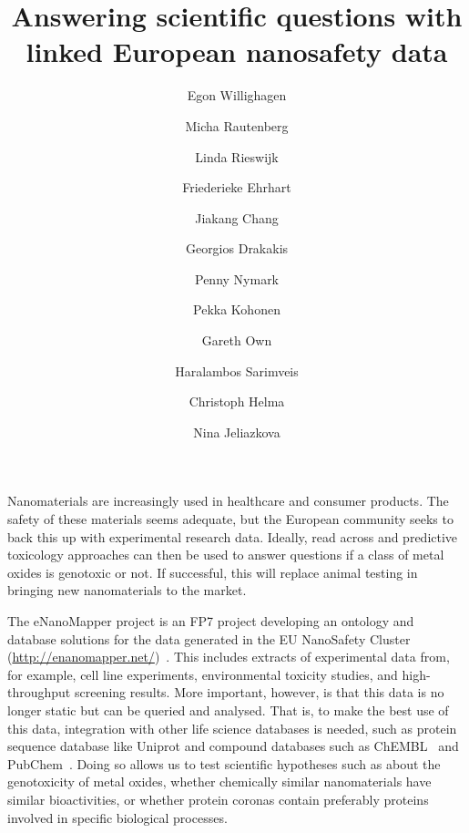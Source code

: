\documentclass{llncs}
\begin{document}
\title{Answering scientific questions with linked European nanosafety data}

\author{
  Egon Willighagen \and
  Micha Rautenberg \and
  Linda Rieswijk \and
  Friederieke Ehrhart \and
  Jiakang Chang \and
  Georgios Drakakis \and
  Penny Nymark \and
  Pekka Kohonen \and
  Gareth Own \and
  Haralambos Sarimveis \and
  Christoph Helma \and
  Nina Jeliazkova
}


\maketitle

Nanomaterials are increasingly used in healthcare and consumer products. The 
safety of these materials seems adequate, but the European community seeks to 
back this up with experimental research data. Ideally, read across and 
predictive toxicology approaches can then be used to answer questions if a class 
of metal oxides is genotoxic or not. If successful, this will replace animal 
testing in bringing new nanomaterials to the market.

The eNanoMapper project is an FP7 project developing an ontology and database 
solutions for the data generated in the EU NanoSafety
Cluster (\url{http://enanomapper.net/})~\cite{Hastings2015,Jeliazkova2015}. This 
includes extracts of experimental data from, for example, cell line experiments, 
environmental toxicity studies, and high-throughput screening results. More 
important, however, is that this data is no longer static but can be queried and 
analysed. That is, to make the best use of this data, integration with other 
life science databases is needed, such as protein sequence database like Uniprot 
and compound databases such as ChEMBL~\cite{Willighagen2013} and
PubChem~\cite{Fu2015}. Doing so allows us to 
test scientific hypotheses such as about the genotoxicity of metal oxides, 
whether chemically similar nanomaterials have similar bioactivities, or whether 
protein coronas contain preferably proteins involved in specific biological 
processes.
\end{document}
